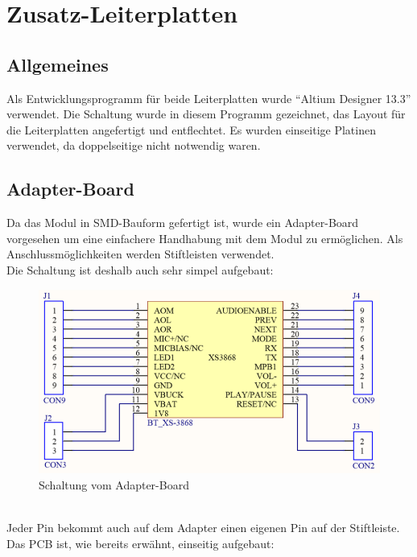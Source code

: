 \chapter{Zusatz-Leiterplatten}
\section{Allgemeines}
Als Entwicklungsprogramm für beide Leiterplatten wurde  \enquote{Altium Designer 13.3} verwendet. Die Schaltung wurde in diesem Programm gezeichnet, das Layout für die Leiterplatten angefertigt und entflechtet. Es wurden einseitige Platinen verwendet, da doppelseitige nicht notwendig waren.

\section{Adapter-Board}
Da das Modul in SMD-Bauform gefertigt ist, wurde ein Adapter-Board vorgesehen um eine einfachere Handhabung mit dem Modul zu ermöglichen. Als Anschlussmöglichkeiten werden Stiftleisten verwendet.\\
Die Schaltung ist deshalb auch sehr simpel aufgebaut:
\begin{figure} [h]
	\centering
	\caption{Schaltung vom Adapter-Board}
	\includegraphics[width=1\textwidth]{schaltungen/adapter_sch.png}
\end{figure} \\
Jeder Pin bekommt auch auf dem Adapter einen eigenen Pin auf der Stiftleiste.
\newpage
Das PCB ist, wie bereits erwähnt, einseitig aufgebaut:
